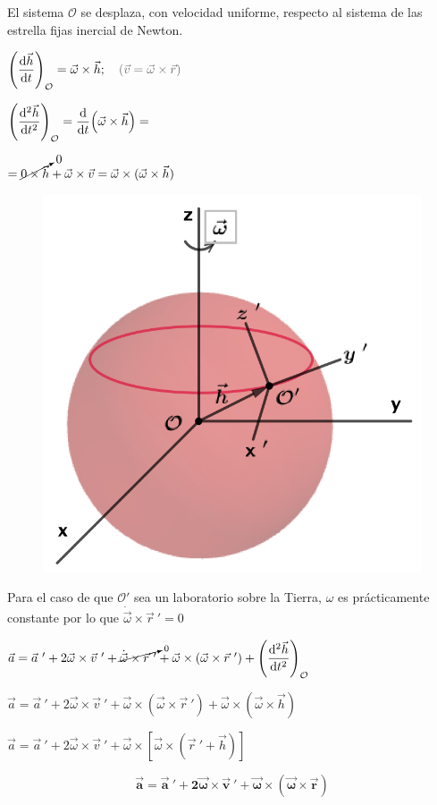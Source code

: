 \begin{multicols}{2}
El sistema $\mathcal O$ se desplaza, con velocidad uniforme, respecto al sistema de las estrella fijas inercial de Newton.	

$\displaystyle \left( \dv{\vec h}{t} \right)_{\mathcal O}=\vec \omega \times \vec h;  \quad \textcolor{gris}{(\vec v=\vec \omega \times \vec r)}$

$\displaystyle \left( \dv[2]{\vec h}{t} \right)_{\mathcal O}= \dv{t} (\vec \omega \times \vec h )= $ 

$=\displaystyle \cancelto{0}{0 \times \vec h} + \vec \omega \times \vec v= \vec \omega \times (\vec \omega \times \vec h)$

\begin{figure}[H]
	\centering
	\includegraphics[width=.5\textwidth]{imagenes/imagenes10/T10IM05.png}
\end{figure}
\end{multicols}

Para el caso de que $\mathcal O'$ sea un laboratorio sobre la Tierra, $\omega$ es prácticamente constante por lo que $\dot{\vec \omega} \times \vec r\ '=0$


$\vec a = \vec a\ ' + 2 \vec \omega \times \vec v\ '+ \cancelto{0}{\dot{\vec \omega}\times \vec r \ ' }+ \vec \omega \times (\vec \omega \times \vec r \ ')+ \left( \displaystyle \dv[2]{\vec h}{t} \right)_{\mathcal O}$


$\vec a = \vec a\ ' + 2 \vec \omega \times \vec v\ '+ \vec \omega \times (\vec \omega \times \vec r \ ')+ \vec \omega \times (\vec \omega \times \vec h)$


$\vec a = \vec a\ ' + 2 \vec \omega \times \vec v\ '+ \vec \omega \times [\vec \omega \times (\vec r \ ' + \vec h)]$

$$\boldsymbol{
\vec a = \vec a\ ' + 2 \vec \omega \times \vec v\ '+ \vec \omega \times (\vec \omega \times \vec r)
}$$



